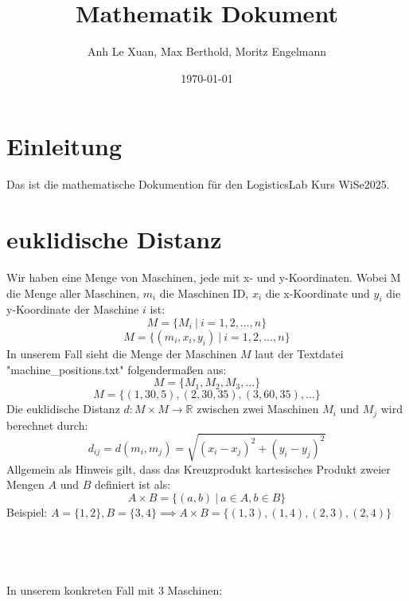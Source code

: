 \documentclass{article}
\title{Mathematik Dokument}
\author{Anh Le Xuan, Max Berthold, Moritz Engelmann}
\date{\today}
\begin{document}
\maketitle

\section{Einleitung}
Das ist die mathematische Dokumention für den LogisticsLab Kurs WiSe2025.

\section{euklidische Distanz}
Wir haben eine Menge von Maschinen, jede mit x- und y-Koordinaten.
Wobei M die Menge aller Maschinen, $m_i$ die Maschinen ID, $x_i$ die x-Koordinate und $y_i$ die y-Koordinate der Maschine $i$ ist:
\begin{equation}
  M = \{M_i\ | \ i = 1, 2, \ldots, n\}
\end{equation}
\begin{equation}
  M = \{(m_i, x_i, y_i) \ | \ i = 1, 2, \ldots, n\}
\end{equation}
In unserem Fall sieht die Menge der Maschinen $M$ laut der Textdatei "machine\_positions.txt" folgendermaßen aus:
\begin{equation}
  M = \{M_1, M_2, M_3, \ldots\}
\end{equation}
\begin{equation}
  M = \{(1, 30, 5), (2, 30, 35), (3, 60, 35), \ldots\}
\end{equation}
Die euklidische Distanz $d: M \times M \rightarrow \mathbb{R} $ zwischen zwei Maschinen $M_i$ und $M_j$ wird berechnet durch:
\begin{equation}
  d_{ij}= d(m_i, m_j) = \sqrt{(x_i - x_j)^2 + (y_i - y_j)^2}
\end{equation}
Allgemein als Hinweis gilt, dass das Kreuzprodukt kartesisches Produkt zweier Mengen $A$ und $B$ definiert ist als:
\begin{equation}
  A \times B = \{(a, b) \ | \ a \in A, b \in B\}
\end{equation}
Beispiel: $A = \{1, 2\}, B = \{3, 4\} \implies A \times B = \{(1, 3), (1, 4), (2, 3), (2, 4)\}$ \\ \\ \\ \\ \\
In unserem konkreten Fall mit 3 Maschinen: \\
\end{document}

